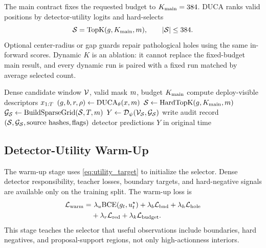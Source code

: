 The main contract fixes the requested budget to $K_{\mathrm{main}}=384$. DUCA ranks valid
positions by detector-utility logits and hard-selects
\begin{equation}
    \mathcal{S} = \mathrm{TopK}(g,K_{\mathrm{main}},m),
    \qquad |\mathcal{S}|\le384.
    \label{eq:hard_topk}
\end{equation}
Optional center-radius or gap guards repair pathological holes using the same
in-forward scores. Dynamic $K$ is an ablation: it cannot replace the fixed-budget
main result, and every dynamic run is paired with a fixed run matched by average
selected count.

\begin{algorithm}[t]
\caption{DUCA in-forward acquisition for one detector forward}
\label{alg:duca_online}
\begin{algorithmic}[1]
\Require Dense candidate window $\mathcal{V}$, valid mask $m$, budget $K_{\mathrm{main}}$
\State compute deploy-visible descriptors $x_{1:T}$
\State $(g,b,r,\rho) \gets \mathrm{DUCA}_{\theta}(x,m)$
\State $\mathcal{S} \gets \mathrm{HardTopK}(g,K_{\mathrm{main}},m)$
\State $\mathcal{G}_{\mathcal{S}} \gets \mathrm{BuildSparseGrid}(\mathcal{S},T,m)$
\State $Y \gets \mathcal{D}_\psi(\mathcal{V}_{\mathcal{S}},\mathcal{G}_{\mathcal{S}})$
\State write audit record $(\Ssel,\Grid_{\Ssel},\mathrm{source\ hashes},\mathrm{flags})$
\State \Return detector predictions $Y$ in original time
\end{algorithmic}
\end{algorithm}

\subsection{Detector-Utility Warm-Up}

The warm-up stage uses \cref{eq:utility_target} to initialize the selector.
Dense detector responsibility, teacher losses, boundary targets, and
hard-negative signals are available only on the training split. The warm-up loss
is
\begin{align}
    \mathcal{L}_{\mathrm{warm}}
    =&\ \lambda_u \mathrm{BCE}(g_t,u^{\star}_t)
      + \lambda_b \mathcal{L}_{\mathrm{bnd}}
      + \lambda_h \mathcal{L}_{\mathrm{hole}} \notag\\
     &+ \lambda_r \mathcal{L}_{\mathrm{red}}
      + \lambda_k \mathcal{L}_{\mathrm{budget}} .
    \label{eq:warmup_loss}
\end{align}
This stage teaches the selector that useful observations include boundaries,
hard negatives, and proposal-support regions, not only high-actionness interiors.

